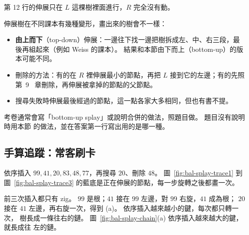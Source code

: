 第 12 行的伸展只在 $L$ 這棵樹裡面進行，$R$ 完全沒有動。

\begin{examnote}
伸展樹在不同課本有幾種變形，畫出來的樹會不一樣：
\begin{itemize}
\item \textbf{由上而下}（top-down）伸展：一邊往下找一邊把樹拆成左、中、右三段，最
後再組起來（例如 Weiss 的課本）。 結果和本節由下而上（bottom-up）的版本可能不同。
\item 刪除的方法：有的在 $R$ 裡伸展最小的節點，再把 $L$ 接到它的左邊；有的先照第~9~
章刪除，再伸展被拿掉的節點的父節點。
\item 搜尋失敗時伸展最後經過的節點，這一點各家大多相同，但也有書不提。
\end{itemize}
考卷通常會寫「bottom-up splay」或說明合併的做法，照題目做。 題目沒有說明時用本節
的做法，並在答案第一行寫出用的是哪一種。
\end{examnote}

\subsection{手算追蹤：常客刷卡}
\label{sec:bal-splay-trace}

依序插入 $99, 41, 20, 83, 48, 77$，再搜尋 $20$、刪除 $48$。 圖~\ref{fig:bal-splay-trace1}
到圖~\ref{fig:bal-splay-trace3} 的藍底是正在伸展的節點，每一步旋轉之後都畫一次。

前三次插入都只有 zig。 $99$ 是根；$41$ 接在 $99$ 左邊，對 $99$ 右旋，$41$ 成為根；
$20$ 接在 $41$ 左邊，再右旋一次，得到 (a)。 依序插入越來越小的鍵，每次都只轉一次，
樹長成一條往右的鏈。 圖~\ref{fig:bal-splay-chain}(a) 依序插入越來越大的鍵，就長成往
左的鏈。

